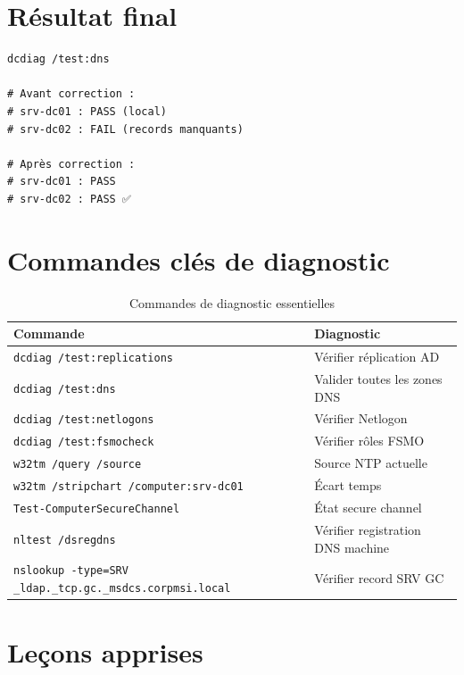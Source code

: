 \section{Résultat final}

\begin{lstlisting}[style=powershell]
dcdiag /test:dns

# Avant correction :
# srv-dc01 : PASS (local)
# srv-dc02 : FAIL (records manquants)

# Après correction :
# srv-dc01 : PASS
# srv-dc02 : PASS ✅
\end{lstlisting}

\section{Commandes clés de diagnostic}

\begin{table}[H]
    \centering
    \begin{tabularx}{\textwidth}{|p{3cm}|p{4cm}|}
        \hline
        \textbf{Commande} & \textbf{Diagnostic} \\
        \hline
        \texttt{dcdiag /test:replications} & Vérifier réplication AD \\
        \hline
        \texttt{dcdiag /test:dns} & Valider toutes les zones DNS \\
        \hline
        \texttt{dcdiag /test:netlogons} & Vérifier Netlogon \\
        \hline
        \texttt{dcdiag /test:fsmocheck} & Vérifier rôles FSMO \\
        \hline
        \texttt{w32tm /query /source} & Source NTP actuelle \\
        \hline
        \texttt{w32tm /stripchart /computer:srv-dc01} & Écart temps \\
        \hline
        \texttt{Test-ComputerSecureChannel} & État secure channel \\
        \hline
        \texttt{nltest /dsregdns} & Vérifier registration DNS machine \\
        \hline
        \texttt{nslookup -type=SRV \_ldap.\_tcp.gc.\_msdcs.corpmsi.local} & Vérifier record SRV GC \\
        \hline
    \end{tabularx}
    \caption{Commandes de diagnostic essentielles}
    \label{tab:diagnostic-cmds}
\end{table}

\section{Leçons apprises}

